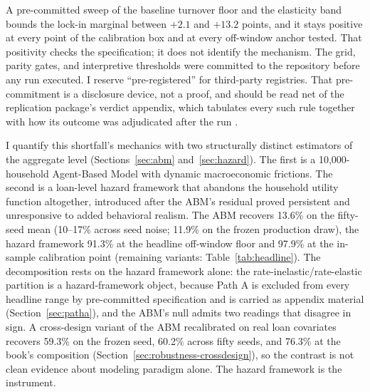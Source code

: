 A pre-committed sweep of the baseline turnover floor and the elasticity band bounds the lock-in marginal between $+2.1$ and $+13.2$ points, and it stays positive at every point of the calibration box and at every off-window anchor tested. That positivity checks the specification; it does not identify the mechanism. The grid, parity gates, and interpretive thresholds were committed to the repository before any run executed. I reserve ``pre-registered'' for third-party registries. That pre-commitment is a disclosure device, not a proof, and should be read net of the replication package's verdict appendix, which tabulates every such rule together with how its outcome was adjudicated after the run \citep{olken2015}.

I quantify this shortfall's mechanics with two structurally distinct estimators of the aggregate level (Sections~\ref{sec:abm} and~\ref{sec:hazard}). The first is a 10,000-household Agent-Based Model with dynamic macroeconomic frictions. The second is a loan-level hazard framework that abandons the household utility function altogether, introduced after the ABM's residual proved persistent and unresponsive to added behavioral realism. The ABM recovers 13.6\% on the fifty-seed mean (10--17\% across seed noise; 11.9\% on the frozen production draw), the hazard framework 91.3\% at the headline off-window floor and 97.9\% at the in-sample calibration point (remaining variants: Table~\ref{tab:headline}). The decomposition rests on the hazard framework alone: the rate-inelastic/rate-elastic partition is a hazard-framework object, because Path A is excluded from every headline range by pre-committed specification and is carried as appendix material (Section~\ref{sec:patha}), and the ABM's null admits two readings that disagree in sign. A cross-design variant of the ABM recalibrated on real loan covariates recovers 59.3\% on the frozen seed, 60.2\% across fifty seeds, and 76.3\% at the book's composition (Section~\ref{sec:robustness-crossdesign}), so the contrast is not clean evidence about modeling paradigm alone. The hazard framework is the instrument.

